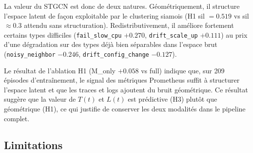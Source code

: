 La valeur du STGCN est donc de deux natures. Géométriquement, il structure l'espace
latent de façon exploitable par le clustering siamois (H1 sil $= 0.519$ vs sil $\approx 0.3$
attendu sans structuration). Redistributivement, il améliore fortement certains types
difficiles (\texttt{fail\_slow\_cpu} $+0.270$, \texttt{drift\_scale\_up} $+0.111$)
au prix d'une dégradation sur des types déjà bien séparables dans l'espace brut
(\texttt{noisy\_neighbor} $-0.246$, \texttt{drift\_config\_change} $-0.127$).

Le résultat de l'ablation H1 (M\_only $+0.058$ vs full) indique que, sur 209 épisodes
d'entraînement, le signal des métriques Prometheus suffit à structurer l'espace latent
et que les traces et logs ajoutent du bruit géométrique. Ce résultat suggère que la valeur
de $T(t)$ et $L(t)$ est prédictive (H3) plutôt que géométrique (H1), ce qui justifie
de conserver les deux modalités dans le pipeline complet.

\subsection{Limitations}
\label{sec:limitations}

